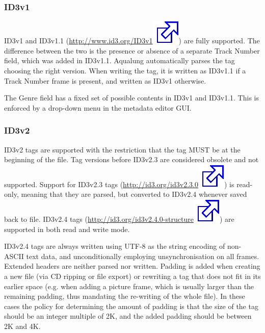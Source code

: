 \documentclass[10pt,english]{article}
\begin{document}
\subsubsection{ID3v1\label{idp780368}}



\noindent ID3v1 and ID3v1.1 (\href{http://www.id3.org/ID3v1}{http://www.id3.org/ID3v1\includegraphics[scale=0.5]{external.eps}})
are fully supported. The difference between the two is the
presence or absence of a separate Track Number field, which
was added in ID3v1.1. Aqualung automatically parses the tag
choosing the right version. When writing the tag, it is
written as ID3v1.1 if a Track Number frame is present, and
written as ID3v1 otherwise.




The Genre field has a fixed set of possible contents in
ID3v1 and ID3v1.1. This is enforced by a drop-down menu in
the metadata editor GUI.




\subsubsection{ID3v2\label{idp783120}}



\noindent ID3v2 tags are supported with the restriction that the
tag MUST be at the beginning of the file. Tag versions
before ID3v2.3 are considered obsolete and not
supported. Support for ID3v2.3 tags (\href{http://id3.org/id3v2.3.0}{http://id3.org/id3v2.3.0\includegraphics[scale=0.5]{external.eps}})
is read-only, meaning that they are parsed, but converted to
ID3v2.4 whenever saved back to file. ID3v2.4 tags (\href{http://id3.org/id3v2.4.0-structure}{http://id3.org/id3v2.4.0-structure\includegraphics[scale=0.5]{external.eps}})
are supported in both read and write mode.




ID3v2.4 tags are always written using UTF-8 as the string
encoding of non-ASCII text data, and unconditionally
employing unsynchronisation on all frames. Extended headers
are neither parsed nor written. Padding is added when
creating a new file (via CD ripping or file export) or
rewriting a tag that does not fit in its earlier space
(e.g. when adding a picture frame, which is usually larger
than the remaining padding, thus mandating the re-writing of
the whole file). In these cases the policy for determining
the amount of padding is that the size of the tag should be
an integer multiple of 2K, and the added padding should be
between 2K and 4K.
\end{document}
